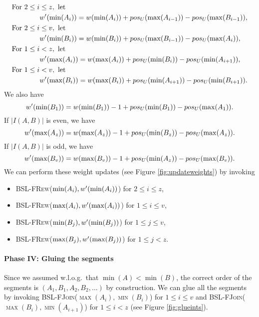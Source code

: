 \documentclass[11pt]{article}
\newcommand{\Bslfjoinx}[2]{\mbox{\textsc{BSL-FJoin(\ensuremath{#1,#2})}}}
\newcommand{\Bslfrewx}[2]{\mbox{\textsc{BSL-FRew(\ensuremath{#1,#2})}}}
\newcommand{\segments}{{\segment}s}
\newcommand{\segment}{segment}
\newcommand{\lasta}{z}
\newcommand{\lastb}{v}
\newcommand{\intmax}[1]{\ensuremath{\max(\intl #1)}}
\newcommand{\intmin}[1]{\ensuremath{\min(\intl #1)}}
\newcommand{\intnum}[2]{\ensuremath{|I(\set{#1},\set{#2})|}}
\newcommand{\intl}[1]{\ensuremath{#1}}
\newcommand{\nodeweight}[1]{{\ensuremath{w(\node #1)}}}
\newcommand{\nodenewweight}[1]{{\ensuremath{w'(\node #1)}}}
\newcommand{\node}[1]{\ensuremath{#1}}
\newcommand{\nodeposition}[2]{pos\ensuremath{_{\set #1}(\node #2)}}
\newcommand{\set}[1]{\ensuremath{#1}}
\begin{document}
{\allowdisplaybreaks 
\begin{align*} 
\mbox{For } 2\leq i &\leq \lasta, \mbox{ let}\\ 
&\nodenewweight{\intmin{A_i}} = \nodeweight{\intmin{A_i}} + \nodeposition{U}{\intmax{A_{i-1}}} - \nodeposition{U}{\intmax{B_{i-1}}},\\ 
\mbox{For } 2\leq i &\leq \lastb , \mbox{ let}\\ 
&\nodenewweight{\intmin{B_i}} = \nodeweight{\intmin{B_i}} + \nodeposition{U}{\intmax{B_{i-1}}} - \nodeposition{U}{\intmax{A_{i}}}, \\ 
\mbox{For } 1\leq i &< \lasta, \mbox{ let}\\ 
&\nodenewweight{\intmax{A_i}} = \nodeweight{\intmax{A_i}} + \nodeposition{U}{\intmin{B_i}} - \nodeposition{U}{\intmin{A_{i+1}}}, \\ 
\mbox{For } 1\leq i &< \lastb , \mbox{ let}\\ 
&\nodenewweight{\intmax{B_i}} = \nodeweight{\intmax{B_i}} + \nodeposition{U}{\intmin{A_{i+1}}} - \nodeposition{U}{\intmin{B_{i+1}}}.
\end{align*}
}
We also have 
\[\nodenewweight{\intmin{B_1}} = \nodeweight{\intmin{B_1}} -1+ \nodeposition{U}{\intmin{B_{1}}} - \nodeposition{U}{\intmax{A_{1}}}. \] 
If $\intnum{A}{B}$ is even, we have 
\[\nodenewweight{\intmax{A_\lasta}} = \nodeweight{\intmax{A_\lasta}} -1 + \nodeposition{U}{\intmin{B_\lasta}} - \nodeposition{U}{\intmax{A_{\lasta}}}. \] 
If $\intnum{A}{B}$ is odd, we have 
\[\nodenewweight{\intmax{B_{\lastb}}} = \nodeweight{\intmax{B_{\lastb}}} -1+ \nodeposition{U}{\intmin{A_{\lasta}}} - \nodeposition{U}{\intmax{B_{\lastb}}}.\]  We can perform these weight updates (see Figure \ref{fig:updateweights}) by invoking 


\begin{itemize} 
\item \Bslfrewx{\intmin{A_i}}{\nodenewweight{\intmin{A_i}}} \quad for  $2\leq i \leq \lasta$, 
\item \Bslfrewx{\intmax{A_i}}{\nodenewweight{\intmax{A_i}}} \quad for  $1\leq i \leq \lastb$, 
\item \Bslfrewx{\intmin{B_j}}{\nodenewweight{\intmin{B_j}}} \quad for  $1\leq j \leq \lastb$, 
\item \Bslfrewx{\intmax{B_j}}{\nodenewweight{\intmax{B_j}}} \quad for  $1\leq j < \lasta$. 
\end{itemize} 




\paragraph{Phase IV: Gluing the \segments{}} Since we assumed w.l.o.g.~that $\intmin A < \intmin B$, the correct order of the \segments{} is $(\intl A_1, \intl B_1, \intl A_2, \intl B_2, \ldots)$ by construction. We can glue all the \segments{} by invoking \Bslfjoinx{\intmax{A_{i}}}{\intmin{B_i}} for $1\leq i \leq \lastb$ and \Bslfjoinx{\intmax{B_{i}}}{\intmin{A_{i+1}}} for $1\leq i < \lasta$ (see Figure \ref{fig:glueints}). 
\end{document}
